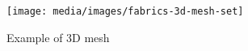 \begin{figure}[H]
  \texttt{[image: media/images/fabrics-3d-mesh-set]}
  \caption{Example of 3D mesh}
  \label{img:fabrics-3d-mesh-set}
\end{figure}
